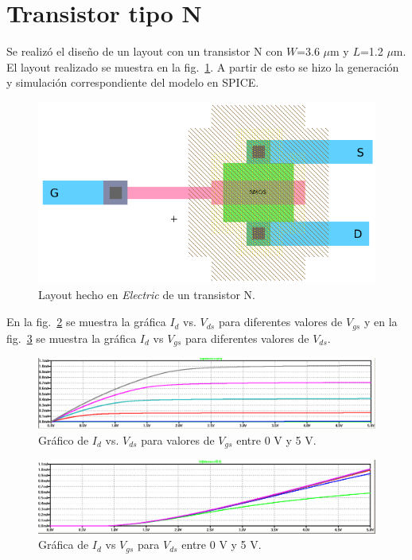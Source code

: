 \documentclass[twocolumn]{IEEEtran}
\begin{document}
\section{Transistor tipo N}
\noindent
Se realizó el diseño de un layout con un transistor N con $W$=3.6 $\mu$m y $L$=1.2 $\mu$m. El layout realizado se muestra en la fig.~\ref{layoutN}. A partir de esto se hizo la generación y simulación correspondiente del modelo en SPICE.

\begin{figure}[H]
  \centering
    \includegraphics[scale=0.3]{pics/layoutN.png}
      \caption{Layout hecho en \textit{Electric} de un transistor N.}
	\label{layoutN}
\end{figure}
\noindent
En la fig.~\ref{simP3} se muestra la gráfica $I_d$ vs. $V_{ds}$ para diferentes valores de $V_{gs}$ y en la fig.~\ref{simP4} se muestra la gráfica $I_d$ vs $V_{gs}$ para diferentes valores de $V_{ds}$. 

\begin{figure}[H]
  \centering
    \includegraphics[scale=0.18]{pics/N_id_vds.png}
      \caption{Gráfico de $I_d$ vs. $V_{ds}$ para valores de $V_{gs}$ entre 0 V y 5 V.}
	\label{simP3}
\end{figure}

\begin{figure}[H]
  \centering
    \includegraphics[scale=0.18]{pics/N_id_vgs.png}
      \caption{Gráfica de $I_d$ vs $V_{gs}$ para $V_{ds}$ entre 0 V y 5 V.}
	\label{simP4}
\end{figure}
\end{document}
